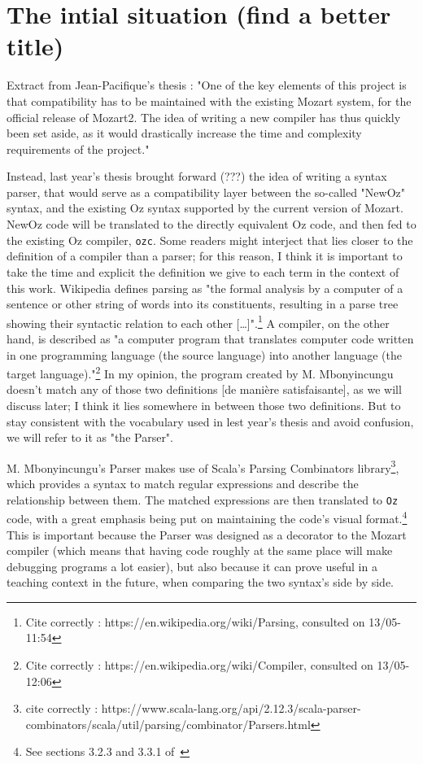 
\section{The intial situation (find a better title)}\label{sec:ch3-0}
Extract from Jean-Pacifique's thesis :
"One of the key elements of this project is that compatibility has to be maintained with the existing Mozart system, for the official release of Mozart2.
The idea of writing a new compiler has thus quickly been set aside, as it would drastically increase the time and complexity requirements of the project."\cite{jpthesis}

Instead, last year's thesis brought forward (???) the idea of writing a syntax parser, that would serve as a compatibility layer between the so-called "NewOz" syntax, and the existing Oz syntax supported by the current version of Mozart.
NewOz code will be translated to the directly equivalent Oz code, and then fed to the existing Oz compiler, \texttt{ozc}.
Some readers might interject that lies closer to the definition of a compiler than a parser;
for this reason, I think it is important to take the time and explicit the definition we give to each term in the context of this work.
Wikipedia defines parsing as "the formal analysis by a computer of a sentence or other string of words into its constituents, resulting in a parse tree showing their syntactic relation to each other [\ldots]".\footnote{Cite correctly : https://en.wikipedia.org/wiki/Parsing, consulted on 13/05-11:54}
A compiler, on the other hand, is described as "a computer program that translates computer code written in one programming language (the source language) into another language (the target language)."\footnote{Cite correctly : https://en.wikipedia.org/wiki/Compiler, consulted on 13/05-12:06}
In my opinion, the program created by M. Mbonyincungu doesn't match any of those two definitions [de manière satisfaisante], as we will discuss later;
I think it lies somewhere in between those two definitions.
But to stay consistent with the vocabulary used in lest year's thesis and avoid confusion, we will refer to it as "the Parser".

M. Mbonyincungu's Parser makes use of Scala's Parsing Combinators library\footnote{cite correctly : https://www.scala-lang.org/api/2.12.3/scala-parser-combinators/scala/util/parsing/combinator/Parsers.html}, which provides a syntax to match regular expressions and describe the relationship between them.
The matched expressions are then translated to \texttt{Oz} code, with a great emphasis being put on maintaining the code's visual format.\footnote{See sections 3.2.3 and 3.3.1 of~\cite{jpthesis}}
This is important because the Parser was designed as a decorator to the Mozart compiler (which means that having code roughly at the same place will make debugging programs a lot easier), but also because it can prove useful in a teaching context in the future, when comparing the two syntax's side by side.

